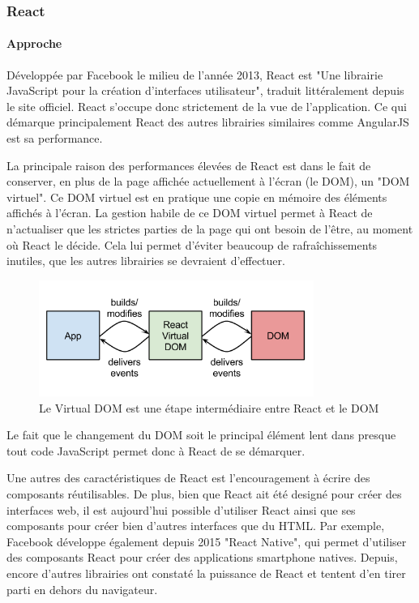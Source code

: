 		\subsubsection{React}\label{techno-react}
		
			\paragraph{Approche}

			Développée par Facebook le milieu de l'année 2013, React est "Une librairie JavaScript pour la création d'interfaces utilisateur"\cite{react}, traduit littéralement depuis le site officiel. React s'occupe donc strictement de la vue de l'application. Ce qui démarque principalement React des autres librairies similaires comme AngularJS est sa performance.

			La principale raison des performances élevées de React est dans le fait de conserver, en plus de la page affichée actuellement à l'écran (le DOM), un "DOM virtuel". Ce DOM virtuel est en pratique une copie en mémoire des éléments affichés à l'écran. La gestion habile de ce DOM virtuel permet à React de n'actualiser que les strictes parties de la page qui ont besoin de l'être, au moment où React le décide. Cela lui permet d'éviter beaucoup de rafraîchissements inutiles, que les autres librairies se devraient d'effectuer.

			\begin{figure}[h]
				\centering
				\includegraphics[width=0.8\textwidth]{images/analyse/virtualDOM}
				\caption{Le Virtual DOM est une étape intermédiaire entre React et le DOM\cite{valuecoders-choosereact}}
				\label{schema_virtualDOM}
			\end{figure}

			Le fait que le changement du DOM soit le principal élément lent dans presque tout code JavaScript permet donc à React de se démarquer.

			Une autres des caractéristiques de React est l'encouragement à écrire des composants réutilisables. De plus, bien que React ait été designé pour créer des interfaces web, il est aujourd'hui possible d'utiliser React ainsi que ses composants pour créer bien d'autres interfaces que du HTML. Par exemple, Facebook développe également depuis 2015 "React Native", qui permet d'utiliser des composants React pour créer des applications smartphone natives. Depuis, encore d'autres librairies ont constaté la puissance de React et tentent d'en tirer parti en dehors du navigateur.

